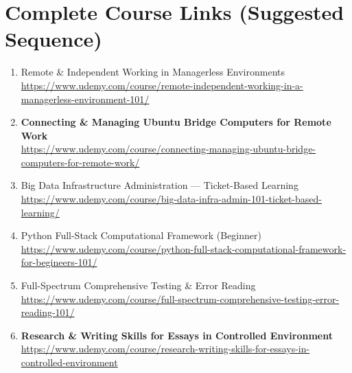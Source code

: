 \documentclass[12pt]{article}
\begin{document}
	\section*{Complete Course Links (Suggested Sequence)}
	
	\begin{enumerate}[label=\textbf{Course \arabic*:}]
		\item Remote \& Independent Working in Managerless Environments \\
		\href{https://www.udemy.com/course/remote-independent-working-in-a-managerless-environment-101/}
		{https://www.udemy.com/course/remote-independent-working-in-a-managerless-environment-101/}
		
		\item \textbf{Connecting \& Managing Ubuntu Bridge Computers for Remote Work} \\
		\href{https://www.udemy.com/course/connecting-managing-ubuntu-bridge-computers-for-remote-work/}
		{https://www.udemy.com/course/connecting-managing-ubuntu-bridge-computers-for-remote-work/}
		
		\item Big Data Infrastructure Administration — Ticket-Based Learning \\
		\href{https://www.udemy.com/course/big-data-infra-admin-101-ticket-based-learning/}
		{https://www.udemy.com/course/big-data-infra-admin-101-ticket-based-learning/}
		
		\item Python Full-Stack Computational Framework (Beginner) \\
		\href{https://www.udemy.com/course/python-full-stack-computational-framework-for-begineers-101/}
		{https://www.udemy.com/course/python-full-stack-computational-framework-for-begineers-101/}
		
		\item Full-Spectrum Comprehensive Testing \& Error Reading \\
		\href{https://www.udemy.com/course/full-spectrum-comprehensive-testing-error-reading-101/}
		{https://www.udemy.com/course/full-spectrum-comprehensive-testing-error-reading-101/}
		
		\item \textbf{Research \& Writing Skills for Essays in Controlled Environment} \\
		\href{https://www.udemy.com/course/research-writing-skills-for-essays-in-controlled-environment}
		{https://www.udemy.com/course/research-writing-skills-for-essays-in-controlled-environment}
		

\end{enumerate}
\end{document}
